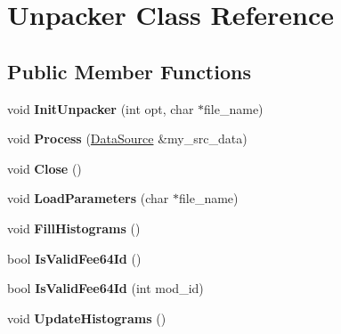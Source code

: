\hypertarget{classUnpacker}{\section{Unpacker Class Reference}
\label{classUnpacker}
}
\subsection*{Public Member Functions}
\begin{DoxyCompactItemize}
\item 
\hypertarget{classUnpacker_a53a5996d1d237b7472c6fa8f7cc154cf}{void {\bfseries Init\-Unpacker} (int opt, char $\ast$file\-\_\-name)}\label{classUnpacker_a53a5996d1d237b7472c6fa8f7cc154cf}

\item 
\hypertarget{classUnpacker_a3b6f311883854730c9457918643df096}{void {\bfseries Process} (\hyperlink{classDataSource}{Data\-Source} \&my\-\_\-src\-\_\-data)}\label{classUnpacker_a3b6f311883854730c9457918643df096}

\item 
\hypertarget{classUnpacker_a895addb324d545ad0777ecfd5631a1f5}{void {\bfseries Close} ()}\label{classUnpacker_a895addb324d545ad0777ecfd5631a1f5}

\item 
\hypertarget{classUnpacker_a7f332b859549c31037c8f81b9b4afb05}{void {\bfseries Load\-Parameters} (char $\ast$file\-\_\-name)}\label{classUnpacker_a7f332b859549c31037c8f81b9b4afb05}

\item 
\hypertarget{classUnpacker_aee0e1898faf8397ce110277c4d183c27}{void {\bfseries Fill\-Histograms} ()}\label{classUnpacker_aee0e1898faf8397ce110277c4d183c27}

\item 
\hypertarget{classUnpacker_ae49de8b0697861a0eda852bce8355b11}{bool {\bfseries Is\-Valid\-Fee64\-Id} ()}\label{classUnpacker_ae49de8b0697861a0eda852bce8355b11}

\item 
\hypertarget{classUnpacker_a1d30cfdd34ed107ffe4ddcd9f9efb533}{bool {\bfseries Is\-Valid\-Fee64\-Id} (int mod\-\_\-id)}\label{classUnpacker_a1d30cfdd34ed107ffe4ddcd9f9efb533}

\item 
\hypertarget{classUnpacker_a0f858d24727475892e49046e284b6fef}{void {\bfseries Update\-Histograms} ()}\label{classUnpacker_a0f858d24727475892e49046e284b6fef}


\end{DoxyCompactItemize}
